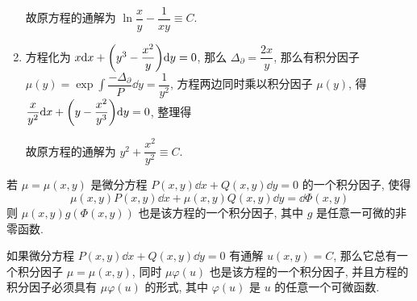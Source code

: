 \begin{solution}
\begin{enumerate}[label=(\arabic{*})]
              故原方程的通解为 $\ln\dfrac{x}{y}-\dfrac{1}{xy}\equiv C.$
        \item 方程化为 $x\dd x+\qty(y^3-\dfrac{x^2}{y})\dd y=0$, 那么 $\Delta_\partial=\dfrac{2x}{y}$, 那么有积分因子 $\mu(y)=\exp\displaystyle\int\dfrac{-\Delta_\partial}{P}\dd y=\dfrac{1}{y^2}$, 
              方程两边同时乘以积分因子 $\mu(y)$, 得 $\dfrac{x}{y^2}\dd x+\qty(y-\dfrac{x^2}{y^3})\dd y=0$, 整理得
              故原方程的通解为 $y^2+\dfrac{x^2}{y^2}\equiv C.$
    \end{enumerate}
\end{solution}

\begin{theorem}
    若 $\mu=\mu(x,y)$ 是微分方程 $P(x,y)\dd x+Q(x,y)\dd y=0$ 的一个积分因子, 使得
    $$\mu(x,y)P(x,y)\dd x+\mu(x,y)Q(x,y)\dd y=\dd \Phi(x,y)$$
    则 $\mu(x,y)g(\Phi(x,y))$ 也是该方程的一个积分因子, 其中 $g$ 是任意一可微的非零函数.
\end{theorem}
\begin{theorem}[积分因子的存在性定理]
    如果微分方程 $P(x,y)\dd x+Q(x,y)\dd y=0$ 有通解 $u(x,y)=C$, 那么它总有一个积分因子 $\mu=\mu(x,y)$, 同时 $\mu\varphi(u)$ 也是该方程的一个积分因子, 并且方程的积分因子必须具有 $\mu\varphi(u)$ 的形式, 其中 $\varphi(u)$ 是 $u$ 的任意一个可微函数.
\end{theorem}

